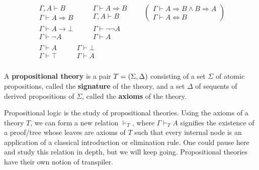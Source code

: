 \documentclass[../main.tex]{subfiles}
\begin{document}
\begin{gather*}
  \begin{array}{c}
    \Gamma, A \vdash B \\\hline \Gamma \vdash A \Rightarrow B
  \end{array}\quad\quad
  \begin{array}{c}
    \Gamma \vdash A \Rightarrow B \\\hline \Gamma, A \vdash B
  \end{array}\quad\quad
  \left(
    \begin{array}{c}
      \Gamma \vdash A \Rightarrow B \wedge B \Rightarrow A \\\hline\hline \Gamma \vdash A
      \Leftrightarrow B
    \end{array}
  \right)\\
  \begin{array}{c}
    \Gamma \vdash A \to \bot \\\hline\hline \Gamma \vdash \neg A
  \end{array}\quad\quad
  \begin{array}{c}
    \Gamma \vdash \neg \neg A \\\hline \Gamma \vdash A
  \end{array}\\
  \begin{array}{c}
    \Gamma \vdash A \\\hline \Gamma \vdash \top
  \end{array}\quad\quad
  \begin{array}{c}
    \Gamma \vdash \bot \\\hline \Gamma \vdash A
  \end{array}\\
\end{gather*}
\begin{definition}
  A \textbf{propositional theory} is a pair \(T = {\left(\Sigma,\Delta\right)}\)
  consisting of a set \(\Sigma\) of atomic propositions, called the
  \textbf{signature} of the theory, and a set \(\Delta\) of sequents of derived
  propositions of \(\Sigma\), called the \textbf{axioms} of the theory.
\end{definition}
Propositional logic is the study of propositional theories. Using the axioms of
a theory \(T\), we can form a new relation \(\vdash_T\), where \(\Gamma \vdash_T
A\) signifies the existence of a proof\-/tree whose leaves are axioms of \(T\)
such that every internal node is an application of a classical introduction or
elimination rule. One could pause here and study this relation in depth, but we
will keep going. Propositional theories have their own notion of transpiler.
\end{document}
